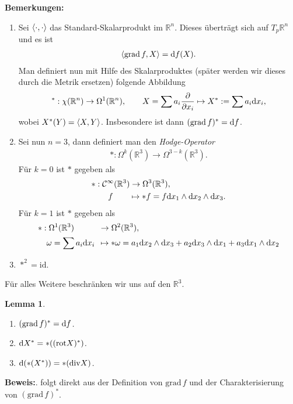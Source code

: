 \documentclass[12pt,a4paper]{article}
\def\R{\mathbb{R}}
\def\id{\mathrm{id}}
\def\grad{\mathrm{grad}\,}
\newtheorem{Lemma}{Lemma}[section]
\def\proof{\noindent\textbf{Beweis:}\quad}
\begin{document}
{\bf Bemerkungen:}
\begin{enumerate}
  \item Sei $\left\langle\cdot,\cdot\right\rangle$ das Standard-Skalarprodukt im $\R^n$. Dieses
  \"ubertr\"agt sich auf $T_p\R^n$ und es ist
\begin{align*}
\scp{\grad f, X} = \df(X).
\end{align*}
Man definiert nun mit Hilfe des Skalarproduktes (sp\"ater werden wir dieses
durch die Metrik ersetzen) folgende Abbildung
\begin{align*}
{}^*: \chi(\R^n) \to \Omega^1(\R^n),\qquad
X = \sum a_i \frac{\partial }{\partial x_i} \mapsto X^* := \sum a_i \dx_i,
\end{align*}
wobei $X^*(Y) = \left\langle X,Y\right\rangle$. Insbesondere ist dann $(\grad f)^* = \df$.
\item Sei nun $n=3$, dann definiert man den \emph{Hodge-Operator}
\begin{align*}
* : \Omega^k(\R^3)\to \Omega^{3-k}(\R^3).
\end{align*}
F\"ur $k=0$ ist $*$ gegeben als
\begin{align*}
* : &\;\mathcal C^\infty(\R^3)\to \Omega^3(\R^3),\\ 
&\quad f\qquad\mapsto * f = f \dx_1\wedge
\dx_2\wedge \dx_3.
\end{align*}
F\"ur $k=1$ ist $*$ gegeben als
\begin{align*}
* : &\; \Omega^1(\R^3)\qquad\quad\to \Omega^2(\R^3), \\
&\omega = \sum a_i \dx_i\;\, \mapsto *\omega = a_1 \dx_2\wedge \dx_3 + a_2
\dx_3 \wedge \dx_1 + a_3 \dx_1\wedge \dx_2
\end{align*}
\item $*^2 = \id$.
\end{enumerate}

\bigskip

F\"ur alles Weitere beschr\"anken wir uns auf den $\R^3$.

\begin{Lemma}
\begin{enumerate}
  \item $(\grad f)^* = \df$.
  \item $\mathrm{d} X^* = *((\mathrm{rot} X)^*)$.
  \item $\mathrm{d}(*(X^*)) = *(\mathrm{div} X)$.
\end{enumerate}
\end{Lemma}
\proof
1. folgt direkt aus der Definition von $\grad f$ und der Charakterisierung von
$(\grad f)^*$.

\medskip
\end{document}
